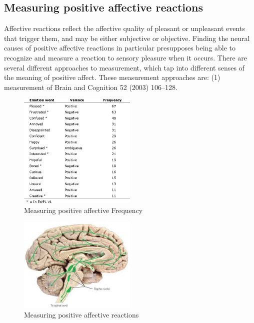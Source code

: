\documentclass[conference]{IEEEtran}
\begin{document}
\subsection{Measuring positive affective reactions}
Affective reactions reflect the affective quality of
pleasant or unpleasant events that trigger them, and
may be either subjective or objective. Finding the neural
causes of positive affective reactions in particular presupposes being able to recognize and measure a reaction
to sensory pleasure when it occurs. There are several
different approaches to measurement, which tap into
different senses of the meaning of positive affect. These
measurement approaches are: (1) measurement of
Brain and Cognition 52 (2003) 106–128.
\begin{figure}[h]
  \centering
  \includegraphics[width=0.5\textwidth]{pic-1.png}
  \caption{Measuring positive affective Frequency}
  \label{fig:example}
\end{figure}


\begin{figure}[h]
  \centering
  \includegraphics[width=0.5\textwidth]{pic-7.jpeg}
  \caption{Measuring positive affective reactions}
  \label{fig:example}
\end{figure}
\end{document}
